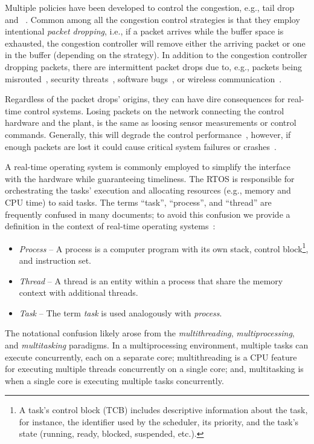 Multiple policies have been developed to control the congestion, e.g., tail drop~\addref{} and ~\addref{}.
Common among all the congestion control strategies is that they employ intentional \emph{packet dropping}, i.e., if a packet arrives while the buffer space is exhausted, the congestion controller will remove either the arriving packet or one in the buffer (depending on the strategy).
In addition to the congestion controller dropping packets, there are intermittent packet drops due to, e.g., packets being misrouted~\addref{}, security threats~\addref{}, software bugs~\addref{}, or wireless communication~\addref{}.

Regardless of the packet drops' origins, they can have dire consequences for real-time control systems.
Losing packets on the network connecting the control hardware and the plant, is the same as loosing sensor measurements or control commands.
Generally, this will degrade the control performance~\addref{}, however, if enough packets are lost it could cause critical system failures or crashes~\addref{}.

A real-time operating system is commonly employed to simplify the interface with the hardware while guaranteeing timeliness.
The RTOS is responsible for orchestrating the tasks' execution and allocating resources (e.g., memory and CPU time) to said tasks.
The terms ``task'', ``process'', and ``thread'' are frequently confused in many documents; to avoid this confusion we provide a definition in the context of real-time operating systems~\addref{}:
%
\begin{itemize}
    \item \emph{Process} -- A process is a computer program with its own stack, control block\footnote{A task's control block (TCB) includes descriptive information about the task, for instance, the identifier used by the scheduler, its priority, and the task's state (running, ready, blocked, suspended, etc.).}, and instruction set.

    \item \emph{Thread} -- A thread is an entity within a process that share the memory context with additional threads.

    \item \emph{Task} -- The term \emph{task} is used analogously with \emph{process}.
\end{itemize}
%
The notational confusion likely arose from the \emph{multithreading}, \emph{multiprocessing}, and \emph{multitasking} paradigms.
In a multiprocessing environment, multiple tasks can execute concurrently, each on a separate core; multithreading is a CPU feature for executing multiple threads concurrently on a single core; and, multitasking is when a single core is executing multiple tasks concurrently.

